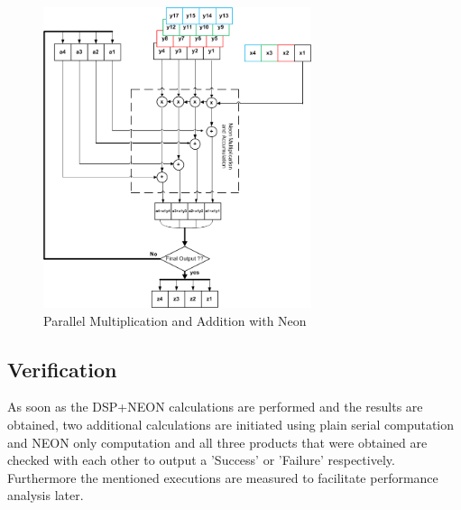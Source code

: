 \begin{figure}[h]
\centering 
\includegraphics[width= 0.7\textwidth]{images/MandA}
\caption{Parallel Multiplication and Addition with Neon  }
\label{fig:neon_mult_add}
\end{figure}

\subsection{Verification}
As soon as the DSP+NEON calculations are performed and the results are obtained, two additional calculations are initiated using plain serial computation and NEON only computation and all three products that were obtained are checked with each other to output a 'Success' or 'Failure' respectively. Furthermore the mentioned executions are measured to facilitate performance analysis later.
